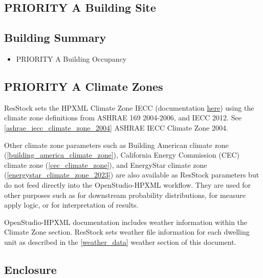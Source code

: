 \subsection{PRIORITY A Building Site}

\subsection{Building Summary}
\begin{itemize} 
  \item PRIORITY A Building Occupancy
\end{itemize}
\subsection{PRIORITY A Climate Zones}
ResStock sets the HPXML Climate Zone IECC (documentation \href{https://openstudio-hpxml.readthedocs.io/en/v1.8.1/workflow_inputs.html#hpxml-climate-zones}{here})  using the climate zone definitions from ASHRAE 169 2004-2006, and IECC 2012. See \ref{ashrae_iecc_climate_zone_2004} ASHRAE IECC Climate Zone 2004. 

Other climate zone parameters such as Building American climate zone (\ref{building_america_climate_zone}), California Energy Commission (CEC) climate zone (\ref{cec_climate_zone}), and EnergyStar climate zone (\ref{energystar_climate_zone_2023}) are also available as ResStock parameters but do not feed directly into the OpenStudio-HPXML workflow. They are used for other purposes such as for downstream probability distributions, for measure apply logic, or for interpretation of results.  

OpenStudio-HPXML documentation includes weather information within the Climate Zone section. ResStock sets weather file information for each dwelling unit as described in the \ref{weather_data} weather section of this document. 
\subsection{Enclosure}
